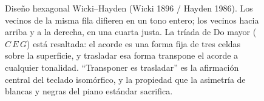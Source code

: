\documentclass[10pt,letterpaper,twocolumn]{article}
\begin{document}
\begin{figure}[t]
\centering
{}
\caption{Diseño hexagonal Wicki--Hayden (Wicki 1896 / Hayden 1986). Los vecinos de la misma fila difieren en un tono entero; los vecinos hacia arriba y a la derecha, en una cuarta justa. La tríada de Do mayor ($C\,E\,G$) está resaltada: el acorde es una forma fija de tres celdas sobre la superficie, y trasladar esa forma transpone el acorde a cualquier tonalidad. ``Transponer es trasladar'' es la afirmación central del teclado isomórfico, y la propiedad que la asimetría de blancas y negras del piano estándar sacrifica.}
\label{fig:wicki}
\end{figure}
\end{document}
